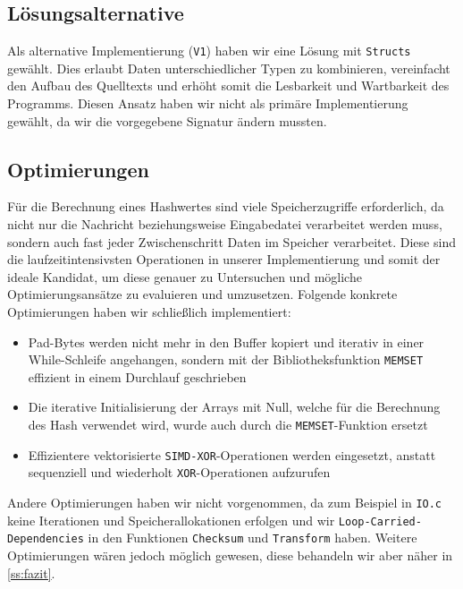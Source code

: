 \documentclass[course=erap]{aspdoc}
\begin{document}
\subsection{Lösungsalternative}

Als alternative Implementierung (\texttt{V1}) haben wir eine Lösung mit \texttt{Structs} gewählt. Dies erlaubt Daten unterschiedlicher Typen zu kombinieren, vereinfacht den Aufbau des Quelltexts und erhöht somit die Lesbarkeit und Wartbarkeit des Programms. Diesen Ansatz haben wir nicht als primäre Implementierung gewählt, da wir die vorgegebene Signatur ändern mussten.

\subsection{Optimierungen} \label{ss:opt}

Für die Berechnung eines Hashwertes sind viele Speicherzugriffe erforderlich, da nicht nur die Nachricht beziehungsweise Eingabedatei verarbeitet werden muss, sondern auch fast jeder Zwischenschritt Daten im Speicher verarbeitet. Diese sind die laufzeitintensivsten Operationen in unserer Implementierung und somit der ideale Kandidat, um diese genauer zu Untersuchen und mögliche Optimierungsansätze zu evaluieren und umzusetzen. Folgende konkrete Optimierungen haben wir schließlich implementiert:

\begin{itemize}
    \item Pad-Bytes werden nicht mehr in den Buffer kopiert und iterativ in einer While-Schleife angehangen, sondern mit der Bibliotheksfunktion \texttt{MEMSET} effizient in einem Durchlauf geschrieben 
    \item Die iterative Initialisierung der Arrays mit Null, welche für die Berechnung des Hash verwendet wird, wurde auch durch die \texttt{MEMSET}-Funktion ersetzt
    \item Effizientere vektorisierte \texttt{SIMD-XOR}-Operationen werden eingesetzt, anstatt sequenziell und wiederholt \texttt{XOR}-Operationen aufzurufen
\end{itemize}  

Andere Optimierungen haben wir nicht vorgenommen, da zum Beispiel in \texttt{IO.c} keine Iterationen und Speicherallokationen erfolgen und wir \texttt{Loop-Carried-Dependencies} in den Funktionen \texttt{Checksum} und \texttt{Transform} haben. Weitere Optimierungen wären jedoch möglich gewesen, diese behandeln wir aber näher in \autoref{ss:fazit}.
\end{document}
